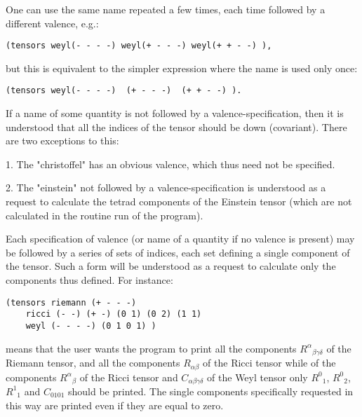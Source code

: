 One can use the same name repeated a  few  times,  each
     time followed by a different valence, e.g.:

\bigskip

\begin{verbatim}
(tensors weyl(- - - -) weyl(+ - - -) weyl(+ + - -) ),
\end{verbatim}

\bigskip

\noindent but this is equivalent to the simpler expression  where  the
     name is used only once:

\bigskip

\begin{verbatim}
(tensors weyl(- - - -)  (+ - - -)  (+ + - -) ).
\end{verbatim}

\bigskip

\noindent If  a  name  of  some  quantity  is  not   followed   by   a
     valence-specification,  then  it  is understood that all the
     indices of the tensor should be down (covariant). There  are
     two exceptions to this:

1. The "christoffel" has an obvious valence, which thus  need
     not be specified.

2. The "einstein" not followed by a valence-specification  is
     understood  as  a request to calculate the tetrad components
of the Einstein tensor (which are not calculated in the routine run of the
program).

Each specification of valence (or name of a quantity if
     no  valence  is present) may be followed by a series of sets
of indices, each set defining a single component of the tensor.  Such  a form
will be understood as a request to calculate only the components thus defined.
For instance:

\bigskip

\begin{verbatim}
(tensors riemann (+ - - -)
    ricci (- -) (+ -) (0 1) (0 2) (1 1)
    weyl (- - - -) (0 1 0 1) )
\end{verbatim}

\bigskip

\noindent means that the user wants the program to print all the  components
${R^{\alpha}}_{\beta \gamma \delta}$ of the Riemann tensor, and all the
components $R_{\alpha \beta}$ of the Ricci tensor while of the components
${R^{\alpha}}_{\beta}$ of the Ricci tensor and $C_{\alpha \beta \gamma \delta}$
of the Weyl tensor only ${R^0}_1$, ${R^0}_2$, ${R^1}_1$ and $C_{0 1 0 1}$
should be printed. The single components specifically requested in this way are
printed  even  if  they  are equal to zero.

